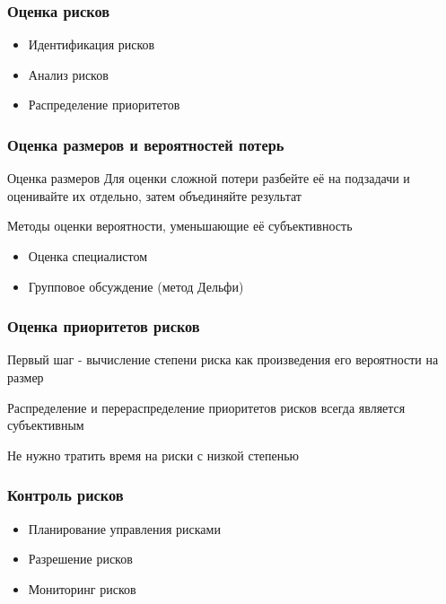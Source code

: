 \documentclass{../industrial-development}
\begin{document}
    \begin{frame} \frametitle{Оценка рисков}
        \begin{itemize}
            \item Идентификация рисков
            \item Анализ рисков
            \item Распределение приоритетов
        \end{itemize}
    \end{frame}
    
    \begin{frame} \frametitle{Оценка размеров и вероятностей потерь}
        \begin{block}{Оценка размеров}
            Для оценки сложной потери разбейте её на подзадачи и оценивайте их отдельно, затем объединяйте результат
        \end{block}
        
        \begin{block}{Методы оценки вероятности, уменьшающие её субъективность}
            \begin{itemize}
                \item Оценка специалистом
                \item Групповое обсуждение (метод Дельфи)
            \end{itemize}
        \end{block}
    \end{frame}

    \begin{frame} \frametitle{Оценка приоритетов рисков}
        \begin{block}{}
            Первый шаг - вычисление степени риска как произведения его вероятности на размер
        \end{block}
        
        \begin{block}{}
            Распределение и перераспределение приоритетов рисков всегда является субъективным
        \end{block}
        
        \begin{block}{}
            Не нужно тратить время на риски с низкой степенью
        \end{block}
    \end{frame}
    
    \begin{frame} \frametitle{Контроль рисков}
        \begin{itemize}
            \item Планирование управления рисками
            \item Разрешение рисков
            \item Мониторинг рисков
        \end{itemize}
    \end{frame}
    
\end{document}
